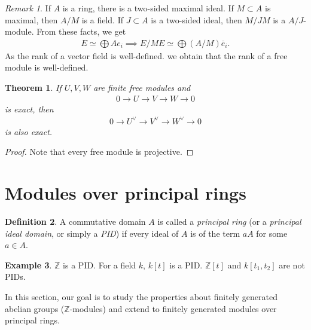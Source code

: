 \documentclass[12pt]{report}
\theoremstyle{plain}
\newtheorem{theorem}{Theorem}[section]
\theoremstyle{remark}
\newtheorem*{remark}{Remark}
\theoremstyle{definition}
\newtheorem{definition}[theorem]{Definition}
\newtheorem{example}[theorem]{Example}
\newcommand{\Z}{\mathbb{Z}}
\begin{document}
\begin{remark}
    If $A$ is a ring, there is a two-sided maximal ideal. If $
    M\subset A$ is maximal, then $A/M$ is a field. If $J\subset A$ is a two-sided ideal, then $M/JM$ is a $A/J$-module. From these facts, we get
    \begin{align*}
        E\simeq \bigoplus Ae_i \implies E/ME\simeq \bigoplus (A/M)\overline{e}_i.
    \end{align*}
    As the rank of a vector field is well-defined. we obtain that the rank of a free module is well-defined.
\end{remark}

\begin{theorem}
    If $U,V,W$ are finite free modules and
    \begin{align*}
        0\to U\to V\to W\to 0
    \end{align*}
    is exact, then
    \begin{align*}
        0\to U^\vee \to V^\vee \to W^\vee \to 0
    \end{align*}
    is also exact.
\end{theorem}
\begin{proof}
    Note that every free module is projective.
\end{proof}


\clearpage
\section{Modules over principal rings}
\begin{definition}
    A commutative domain $A$ is called a \emph{principal ring} (or a \emph{principal ideal domain}, or simply a \emph{PID}) if every ideal of $A$ is of the term $aA$ for some $a\in A$.
\end{definition}

\begin{example}
    $\Z$ is a PID. For a field $k$, $k[t]$ is a PID. $\Z[t]$ and $k[t_1,t_2]$ are not PIDs.
\end{example}

In this section, our goal is to study the properties about finitely generated abelian groups ($\Z$-modules) and extend to finitely generated modules over principal rings.
\end{document}
